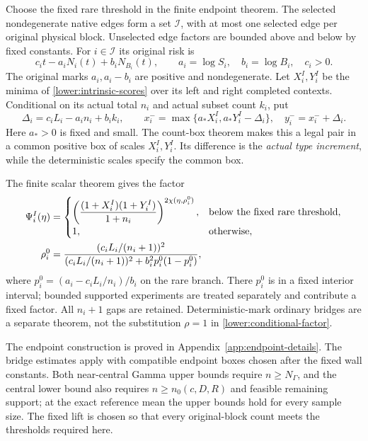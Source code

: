 Choose the fixed rare threshold in the finite endpoint theorem.
The selected nondegenerate native edges form a set $\mathcal I$,
with at most one selected edge per original physical block.
Unselected edge factors are bounded above and below by fixed constants.
For $i\in\mathcal I$ its original risk is
\[
 c_it-a_iN_i(t)+b_iN_{B_i}(t),\qquad
 a_i=\log S_i,\quad b_i=\log B_i,\quad c_i>0.
\]
The original marks $a_i,a_i-b_i$ are positive and nondegenerate.
Let $X_i^I,Y_i^I$ be the minima of \eqref{lower:intrinsic-scores}
over its left and right completed contexts.  Conditional on its
actual total $n_i$ and actual subset count $k_i$, put
\begin{equation}
 \Delta_i=c_iL_i-a_in_i+b_ik_i,\qquad
 x_i^- =\max\{a_*X_i^I,a_*Y_i^I-\Delta_i\},\quad
 y_i^-=x_i^-+\Delta_i.
 \label{lower:local-pair}
\end{equation}
Here $a_*>0$ is fixed and small.  The count-box theorem makes this
a legal pair in a common positive box of scales $X_i^I,Y_i^I$.
Its difference is the \emph{actual type increment}, while the
deterministic scales specify the common box.

The finite scalar theorem gives the factor
\begin{align}
 \Psi_i^I(\eta)&=
 \begin{cases}
 \left(\dfrac{(1+X_i^I)(1+Y_i^I)}{1+n_i}\right)^{2\chi(\eta,\rho_i^0)},
       &\text{below the fixed rare threshold},\\
 1,&\text{otherwise},
 \end{cases}\notag\\
 \rho_i^0&=\frac{(c_iL_i/(n_i+1))^2}
 {(c_iL_i/(n_i+1))^2+b_i^2p_i^0(1-p_i^0)},
 \label{lower:conditional-factor}
\end{align}
where $p_i^0=(a_i-c_iL_i/n_i)/b_i$ on the rare branch.
There $p_i^0$ is in a fixed interior interval; bounded supported
experiments are treated separately and contribute a fixed factor.
All $n_i+1$ gaps are retained.  Deterministic-mark ordinary bridges
are a separate theorem, not the substitution $\rho=1$ in
\eqref{lower:conditional-factor}.

The endpoint construction is proved in Appendix~\ref{app:endpoint-details}.
The bridge estimates apply with compatible endpoint boxes chosen after
the fixed wall constants. Both near-central Gamma upper bounds require
$n\geq N_\Gamma$, and the central lower bound also requires
$n\geq n_0(c,D,R)$ and feasible remaining support; at the exact reference
mean the upper bounds hold for every sample size. The fixed lift is
chosen so that every original-block count meets the thresholds required
here.

